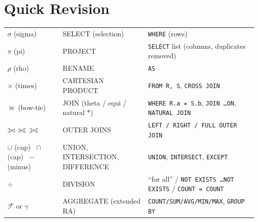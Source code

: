 \documentclass[10pt,a4paper]{article}
\def\ojoin{\setbox0=\hbox{$\bowtie$}\rule[-.02ex]{.25em}{.4pt}\llap{\rule[\ht0]{.25em}{.4pt}}}
\def\lojoin{\mathbin{\ojoin\mkern-5.8mu\bowtie}}
\def\rojoin{\mathbin{\bowtie\mkern-5.8mu\ojoin}}
\def\fojoin{\mathbin{\ojoin\mkern-5.8mu\bowtie\mkern-5.8mu\ojoin}}
\newcommand{\agg}{\mathcal{F}}            %
\begin{document}
\section{Quick Revision}

\begin{keybox}
\small
\begin{tabularx}{\linewidth}{@{}l l X@{}}
$\sigma$ (sigma) & SELECT (selection) & \texttt{WHERE} (rows)\\
$\pi$ (pi) & PROJECT & \texttt{SELECT} list (columns, duplicates removed)\\
$\rho$ (rho) & RENAME & \texttt{AS}\\
$\times$ (times) & CARTESIAN PRODUCT & \texttt{FROM R, S}, \texttt{CROSS JOIN}\\
$\bowtie$ (bow-tie) & JOIN (theta / equi / natural $*$) & \texttt{WHERE R.a = S.b}, \texttt{JOIN \dots ON}, \texttt{NATURAL JOIN}\\
$\lojoin\ \rojoin\ \fojoin$ & OUTER JOINS & \texttt{LEFT / RIGHT / FULL OUTER JOIN}\\
$\cup$ (cup) \ $\cap$ (cap) \ $-$ (minus) & UNION, INTERSECTION, DIFFERENCE & \texttt{UNION}, \texttt{INTERSECT}, \texttt{EXCEPT}\\
$\div$ & DIVISION & ``for all'' / \texttt{NOT EXISTS \dots NOT EXISTS} / \texttt{COUNT = COUNT}\\
$\agg$ or $\gamma$ & AGGREGATE (extended RA) & \texttt{COUNT/SUM/AVG/MIN/MAX}, \texttt{GROUP BY}\\
\end{tabularx}
\end{keybox}
\end{document}
